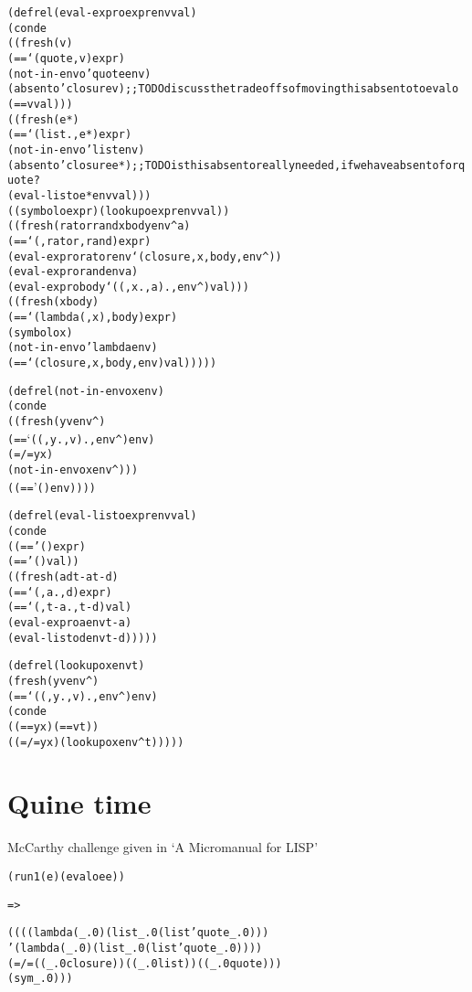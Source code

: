 \documentclass{book}
\begin{document}
\begin{alltt}
(defrel (eval-expro expr env val)
  (conde
    ((fresh (v)
       (== `(quote ,v) expr)
       (not-in-envo 'quote env)
       (absento 'closure v) ;; TODO discuss the tradeoffs of moving this absento to evalo
       (== v val)))
    ((fresh (e*)
       (== `(list . ,e*) expr)
       (not-in-envo 'list env)
       (absento 'closure e*) ;; TODO is this absento really needed, if we have absento for quote?
       (eval-listo e* env val)))
    ((symbolo expr) (lookupo expr env val))
    ((fresh (rator rand x body env^ a)
       (== `(,rator ,rand) expr)
       (eval-expro rator env `(closure ,x ,body ,env^))
       (eval-expro rand env a)
       (eval-expro body `((,x . ,a) . ,env^) val)))
    ((fresh (x body)
       (== `(lambda (,x) ,body) expr)
       (symbolo x)
       (not-in-envo 'lambda env)
       (== `(closure ,x ,body ,env) val)))))
\end{alltt}
  
\begin{alltt}
(defrel (not-in-envo x env)
  (conde
    ((fresh (y v env^)
       (== `((,y . ,v) . ,env^) env)
       (=/= y x)
       (not-in-envo x env^)))
    ((== '() env))))
\end{alltt}
  
\begin{alltt}
(defrel (eval-listo expr env val)
  (conde
    ((== '() expr)
     (== '() val))
    ((fresh (a d t-a t-d)
       (== `(,a . ,d) expr)
       (== `(,t-a . ,t-d) val)
       (eval-expro a env t-a)
       (eval-listo d env t-d)))))
\end{alltt}
  
\begin{alltt}
(defrel (lookupo x env t)
  (fresh (y v env^)
    (== `((,y . ,v) . ,env^) env)
    (conde
      ((== y x) (== v t))
      ((=/= y x) (lookupo x env^ t)))))
\end{alltt}



\chapter{Quine time}%

McCarthy challenge given in `A Micromanual for LISP'

\begin{alltt}
(run 1 (e) (evalo e e))
\end{alltt}
\verb|=>|
\begin{alltt}
((((lambda (_.0) (list _.0 (list 'quote _.0)))
   '(lambda (_.0) (list _.0 (list 'quote _.0))))
  (=/= ((_.0 closure)) ((_.0 list)) ((_.0 quote)))
  (sym _.0)))
\end{alltt}
\end{document}

